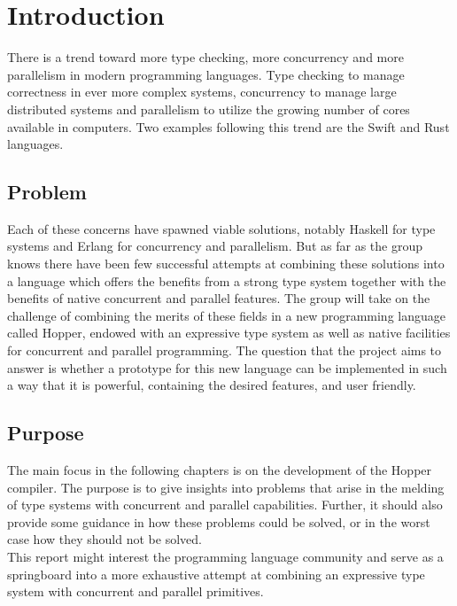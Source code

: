\chapter{Introduction}

There is a trend toward more type checking, more concurrency and more parallelism in modern programming languages. Type checking to manage correctness in ever more complex systems, concurrency to manage large distributed systems and parallelism to utilize the growing number of cores available in computers. Two examples following this trend are the Swift \cite{swift} and Rust \cite{rust} languages.

\section{Problem}

Each of these concerns have spawned viable solutions, notably Haskell \cite{haskell} for type systems and Erlang \cite{erlang} for concurrency and parallelism. But as far as the group knows there have been few successful attempts at combining these solutions into a language which offers the benefits from a strong type system together with the benefits of native concurrent and parallel features. The group will take on the challenge of combining the merits of these fields in a new programming language called Hopper, endowed with an expressive type system as well as native facilities for concurrent and parallel programming. The question that the project aims to answer is whether a prototype for this new language can be implemented in such a way that it is powerful, containing the desired features, and user friendly.

\section{Purpose}

The main focus in the following chapters is on the development of the Hopper compiler. The purpose is to give insights into problems that arise in the melding of type systems with concurrent and parallel capabilities. Further, it should also provide some guidance in how these problems could be solved, or in the worst case how they should not be solved.\\ %
This report might interest the programming language community and serve as a springboard into a more exhaustive attempt at combining an expressive type system with concurrent and parallel primitives.

